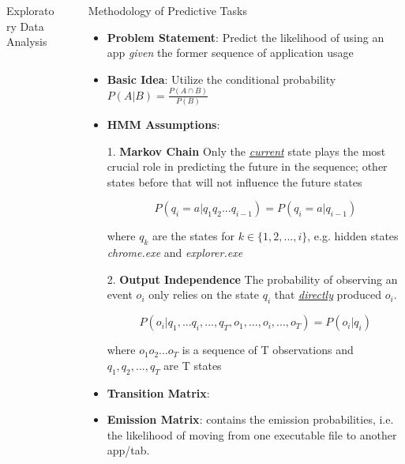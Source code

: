 \documentclass[final]{beamer}
\newlength{\sepwidth}
\newlength{\colwidth}
\newcommand{\separatorcolumn}{\begin{column}{\sepwidth}\end{column}}
\begin{document}
\begin{frame}[t]
\begin{columns}[t]
\begin{column}{\colwidth}
\begin{block}{Exploratory Data Analysis}
  \end{block}

\end{column}

\separatorcolumn

\begin{column}{\colwidth}

\begin{exampleblock}{Methodology of Predictive Tasks}


   \begin{itemize}
       \item \textbf{Problem Statement}: Predict the likelihood of using an app \textit{given} the former sequence of application usage
       \item \textbf{Basic Idea}: Utilize the conditional probability $P(A|B) = \frac{P(A\cap B)}{P(B)}$
       \item \textbf{HMM Assumptions}:
           
            1. \textbf{Markov Chain} Only the \underline{\textit{current}} state plays the most crucial role in predicting the future in the sequence; other states before that will not influence the future states 

            $$P(q_i = a | q_1q_2...q_{i-1}) = P(q_i= a | q_{i-1})$$

            where $q_k$ are the states for $k \in \{1, 2, ..., i\}$, e.g. hidden states \textit{chrome.exe} and \textit{explorer.exe}

           2. \textbf{Output Independence} The probability of observing an event $o_i$ only relies on the state $q_i$ that \underline{\textit{directly}} produced $o_i$. 
           
           $$P(o_i | q_1, ... q_i , ..., q_T, o_1, ..., o_i, ..., o_T) = P(o_i | q_i)$$
           
           where $o_1o_2...o_T$ is a sequence of T observations and $q_1, q_2 , ...,q_T$ are T states

        \item \textbf{Transition Matrix}:

        \item \textbf{Emission Matrix}: contains the emission probabilities, i.e. the likelihood of moving from one executable file to another app/tab. 
        
       \end{itemize}
          

\end{exampleblock}
\end{column}
\end{columns}
\end{frame}
\end{document}
